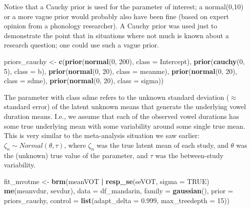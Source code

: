 \documentclass[12pt,]{krantz}
\newenvironment{Shaded}{\begin{snugshade}}{\end{snugshade}}
\newcommand{\KeywordTok}[1]{\textcolor[rgb]{0.13,0.29,0.53}{\textbf{#1}}}
\newcommand{\DataTypeTok}[1]{\textcolor[rgb]{0.13,0.29,0.53}{#1}}
\newcommand{\DecValTok}[1]{\textcolor[rgb]{0.00,0.00,0.81}{#1}}
\newcommand{\FloatTok}[1]{\textcolor[rgb]{0.00,0.00,0.81}{#1}}
\newcommand{\StringTok}[1]{\textcolor[rgb]{0.31,0.60,0.02}{#1}}
\newcommand{\OtherTok}[1]{\textcolor[rgb]{0.56,0.35,0.01}{#1}}
\newcommand{\OperatorTok}[1]{\textcolor[rgb]{0.81,0.36,0.00}{\textbf{#1}}}
\newcommand{\NormalTok}[1]{#1}
\theoremstyle{definition}
\theoremstyle{definition}
\theoremstyle{definition}
\theoremstyle{remark}
\begin{document}
Notice that a Cauchy prior is used for the parameter of interest; a
normal(0,10) or a more vague prior would probably also have been fine
(based on expert opinion from a phonology researcher). A Cauchy prior
was used just to demonstrate the point that in situations where not much
is known about a research question; one could use such a vague prior.

\begin{Shaded}
\begin{Highlighting}[]
\NormalTok{priors_cauchy <-}\StringTok{ }\KeywordTok{c}\NormalTok{(}\KeywordTok{prior}\NormalTok{(}\KeywordTok{normal}\NormalTok{(}\DecValTok{0}\NormalTok{, }\DecValTok{200}\NormalTok{), }\DataTypeTok{class =}\NormalTok{ Intercept),}
                   \KeywordTok{prior}\NormalTok{(}\KeywordTok{cauchy}\NormalTok{(}\DecValTok{0}\NormalTok{, }\DecValTok{5}\NormalTok{), }\DataTypeTok{class =}\NormalTok{ b),}
                   \KeywordTok{prior}\NormalTok{(}\KeywordTok{normal}\NormalTok{(}\DecValTok{0}\NormalTok{, }\DecValTok{20}\NormalTok{), }\DataTypeTok{class =}\NormalTok{ meanme),}
                   \KeywordTok{prior}\NormalTok{(}\KeywordTok{normal}\NormalTok{(}\DecValTok{0}\NormalTok{, }\DecValTok{20}\NormalTok{), }\DataTypeTok{class =}\NormalTok{ sdme),}
                   \KeywordTok{prior}\NormalTok{(}\KeywordTok{normal}\NormalTok{(}\DecValTok{0}\NormalTok{, }\DecValTok{20}\NormalTok{), }\DataTypeTok{class =}\NormalTok{ sigma))}
\end{Highlighting}
\end{Shaded}

The parameter with class sdme refers to the unknown standard deviation
(\(\approx\) standard error) of the latent unknown means that generate
the underlying vowel duration means. I.e., we assume that each of the
observed vowel durations has some true underlying mean with some
variability around some single true mean. This is very similar to the
meta-analysis situation we saw earlier:
\(\zeta_n \sim Normal(\theta,\tau)\), where \(\zeta_n\) was the true
latent mean of each study, and \(\theta\) was the (unknown) true value
of the parameter, and \(\tau\) was the between-study variability.

\begin{Shaded}
\begin{Highlighting}[]
\NormalTok{fit_mvotme <-}\StringTok{ }\KeywordTok{brm}\NormalTok{(meanVOT }\OperatorTok{|}\StringTok{ }\KeywordTok{resp_se}\NormalTok{(seVOT, }\DataTypeTok{sigma =} \OtherTok{TRUE}\NormalTok{) }\OperatorTok{~}
\StringTok{                    }\KeywordTok{me}\NormalTok{(meanvdur, sevdur),}
                  \DataTypeTok{data =}\NormalTok{ df_mandarin, }
                  \DataTypeTok{family =} \KeywordTok{gaussian}\NormalTok{(), }
                  \DataTypeTok{prior =}\NormalTok{ priors_cauchy,}
                  \DataTypeTok{control =} \KeywordTok{list}\NormalTok{(}\DataTypeTok{adapt_delta =} \FloatTok{0.999}\NormalTok{,}
                                 \DataTypeTok{max_treedepth =} \DecValTok{15}\NormalTok{))}
\end{Highlighting}
\end{Shaded}
\end{document}
